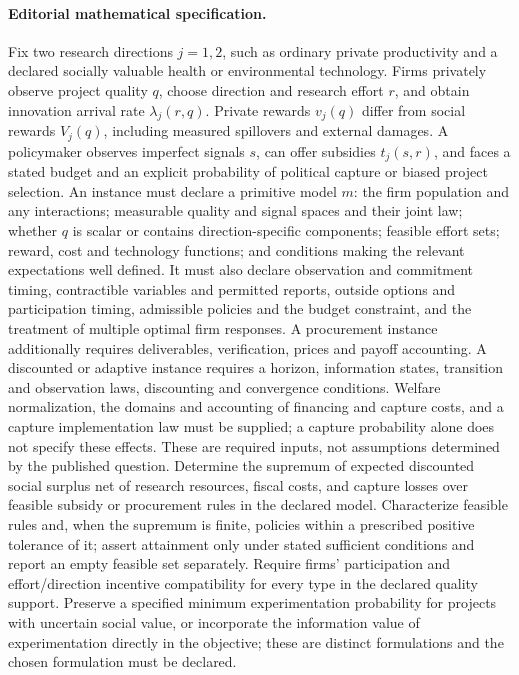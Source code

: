 \documentclass[11pt,a4paper]{article}
\begin{document}
\paragraph{Editorial mathematical specification.} Fix two research directions \(j=1,2\), such as ordinary private productivity and a declared socially valuable health or environmental technology. Firms privately observe project quality \(q\), choose direction and research effort \(r\), and obtain innovation arrival rate \(\lambda_j(r,q)\). Private rewards \(v_j(q)\) differ from social rewards \(V_j(q)\), including measured spillovers and external damages. A policymaker observes imperfect signals \(s\), can offer subsidies \(t_j(s,r)\), and faces a stated budget and an explicit probability of political capture or biased project selection.
An instance must declare a primitive model \(m\): the firm population and any interactions; measurable quality and signal spaces and their joint law; whether \(q\) is scalar or contains direction-specific components; feasible effort sets; reward, cost and technology functions; and conditions making the relevant expectations well defined. It must also declare observation and commitment timing, contractible variables and permitted reports, outside options and participation timing, admissible policies and the budget constraint, and the treatment of multiple optimal firm responses. A procurement instance additionally requires deliverables, verification, prices and payoff accounting. A discounted or adaptive instance requires a horizon, information states, transition and observation laws, discounting and convergence conditions. Welfare normalization, the domains and accounting of financing and capture costs, and a capture implementation law must be supplied; a capture probability alone does not specify these effects. These are required inputs, not assumptions determined by the published question.
Determine the supremum of expected discounted social surplus net of research resources, fiscal costs, and capture losses over feasible subsidy or procurement rules in the declared model. Characterize feasible rules and, when the supremum is finite, policies within a prescribed positive tolerance of it; assert attainment only under stated sufficient conditions and report an empty feasible set separately. Require firms’ participation and effort/direction incentive compatibility for every type in the declared quality support. Preserve a specified minimum experimentation probability for projects with uncertain social value, or incorporate the information value of experimentation directly in the objective; these are distinct formulations and the chosen formulation must be declared.
\end{document}
